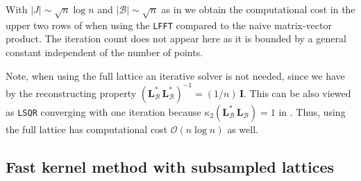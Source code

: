 \documentclass[a4paper]{amsart}
\begin{document}
With $|J| \sim \sqrt n \log n$ and $|\mathcal B| \sim \sqrt{n}$ as in  we obtain the computational cost in the upper two rows of  when using the \texttt{LFFT} compared to the naive matrix-vector product.
The iteration count does not appear here as it is bounded by a general constant independent of the number of points.

\begin{table} \centering
    \vspace{10pt}
    \caption{Computational cost for the least squares approximation $S_{\mathcal B}^{\bm X_J}$ and the kernel method $A_{\text{ker}}^{\bm X_J}$ with a subsampled lattice of size $|J| = \lceil\sqrt{n}\,\log n\rceil$ utilizing the FFT compared to the naive matrix-vector product.
    Here $r$ is the number of iterations depending on the condition number of the kernel matrix.}\label{tab:cost}
\end{table} 

Note, when using the full lattice an iterative solver is not needed, since we have by the reconstructing property $(\bm L_{\mathcal B}^{\ast} \, \bm L_{\mathcal B}^{\ast})^{-1} = (1/n)\,\bm I$.
This can be also viewed as \texttt{LSQR} converging with one iteration because $\kappa_2(\bm L_{\mathcal B}^{\ast} \, \bm L_{\mathcal B}) = 1$ in .
Thus, using the full lattice has computational cost $\mathcal O(n\log n)$ as well.



\subsection{Fast kernel method with subsampled lattices}\label{sec:ikernel} 
\end{document}
